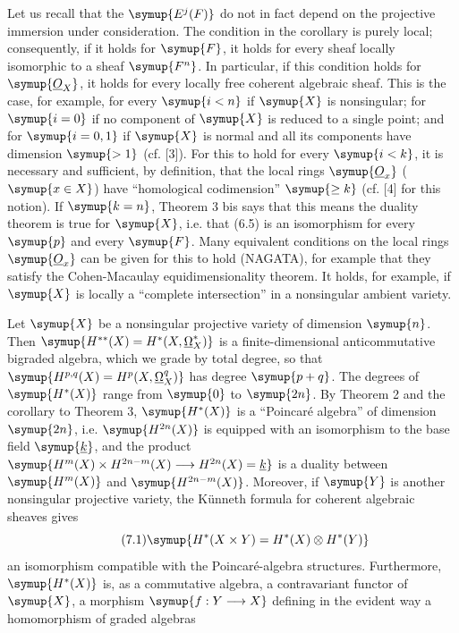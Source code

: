 Let us recall that the $\symup{E^{j}(F)}$ do not in fact depend on the projective immersion
under consideration. The condition in the corollary is purely local;
consequently, if it holds for $\symup{F}$, it holds for every sheaf locally isomorphic
to a sheaf $\symup{F^{n}}$. In particular, if this condition holds for $\symup{\Osh_X}$, it
holds for every locally free coherent algebraic sheaf. This is the case, for
example, for every $\symup{i<n}$ if $\symup{X}$ is nonsingular; for $\symup{i=0}$ if no component of
$\symup{X}$ is reduced to a single point; and for $\symup{i=0,1}$ if $\symup{X}$ is normal and all its
components have dimension $\symup{>1}$ (cf. [3]). For this to
hold for every $\symup{i<k}$, it is necessary and sufficient, by definition, that the
local rings $\symup{\Osh_x}$ ($\symup{x\in X}$) have ``homological codimension'' $\symup{\geq k}$ (cf.
[4] for this notion). If $\symup{k=n}$, Theorem 3 bis says that this means the duality
theorem is true for $\symup{X}$, i.e. that (6.5) is an isomorphism for every $\symup{p}$ and
every $\symup{F}$. Many equivalent conditions on the local rings $\symup{\Osh_x}$ can be given
for this to hold (NAGATA), for example that they satisfy the Cohen-Macaulay
equidimensionality theorem. It holds, for example, if $\symup{X}$ is locally a
``complete intersection'' in a nonsingular ambient variety.


Let $\symup{X}$ be a nonsingular projective variety of dimension $\symup{n}$. Then
$\symup{H^{**}(X)=H^{*}(X,\underline{\Omega}_X^{*})}$
is a finite-dimensional anticommutative bigraded algebra, which we grade by
total degree, so that $\symup{H^{p,q}(X)=H^{p}(X,\underline{\Omega}_X^{q})}$ has degree $\symup{p+q}$. The
degrees of $\symup{H^{*}(X)}$ range from $\symup{0}$ to $\symup{2n}$. By Theorem 2 and the corollary to
Theorem 3, $\symup{H^{*}(X)}$ is a ``Poincaré algebra'' of dimension $\symup{2n}$, i.e.
$\symup{H^{2n}(X)}$ is equipped with an isomorphism to the base field $\symup{\underline{k}}$, and the
product
$\symup{H^{m}(X)\times H^{2n-m}(X)\longrightarrow H^{2n}(X)=\underline{k}}$
is a duality between $\symup{H^{m}(X)}$ and $\symup{H^{2n-m}(X)}$. Moreover, if $\symup{Y}$ is another
nonsingular projective variety, the Künneth formula for coherent algebraic
sheaves gives
\begin{equation}\tag{7.1}
  \symup{H^{*}(X\times Y)=H^{*}(X)\otimes H^{*}(Y)}
\end{equation}
an isomorphism compatible with the Poincaré-algebra structures. Furthermore,
$\symup{H^{*}(X)}$ is, as a commutative algebra, a contravariant functor of $\symup{X}$, a
morphism $\symup{f:Y\longrightarrow X}$ defining in the evident way a homomorphism of
graded algebras

